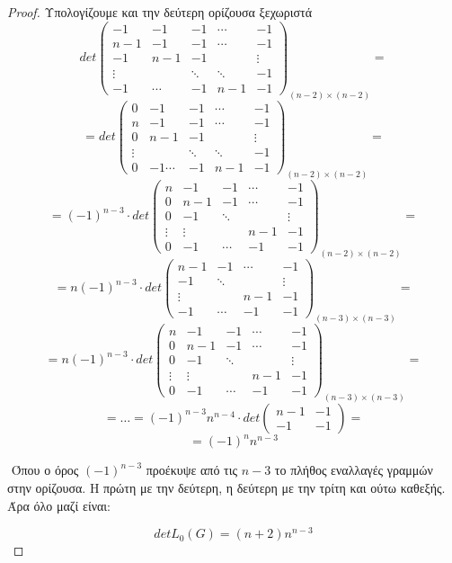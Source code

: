\documentclass[oneside,a4paper]{article}
\begin{document}
\begin{proof}
	$ $\newline Υπολογίζουμε και την δεύτερη ορίζουσα ξεχωριστά
	$$det \begin{pmatrix}
		-1 & -1 & -1 & \cdots & -1 \\
		n-1& -1 & -1 &  \cdots & -1 \\
		-1 &  n-1 & -1  &  & \vdots \\
		 \vdots &  & \ddots & \ddots & -1 \\
		-1 & \cdots  & -1 & n-1 & -1
	\end{pmatrix}_{(n-2)\times(n-2)} = $$
	$$ = det\begin{pmatrix}
		0 & -1 & -1 & \cdots & -1 \\
		n& -1 & -1 &  \cdots & -1 \\
		0 &  n-1 & -1  &  & \vdots \\
		 \vdots &  & \ddots & \ddots & -1 \\
		0 & -1\cdots  & -1 & n-1 & -1
	\end{pmatrix}_{(n-2)\times(n-2)} = $$
	$$ = (-1)^{n-3} \cdot det\begin{pmatrix}
		n & -1 & -1 & \cdots & -1 \\
		0& n-1 & -1 &  \cdots & -1 \\
		0 &  -1 & \ddots  &  & \vdots \\
		 \vdots &  \vdots &  & n-1 & -1 \\
		0 & -1  & \cdots & -1 & -1
	\end{pmatrix}_{(n-2)\times(n-2)} = $$
	$$ = n (-1)^{n-3} \cdot det\begin{pmatrix}
		 n-1 & -1 &  \cdots & -1 \\
		  -1 & \ddots  &  & \vdots \\
		  \vdots &  & n-1 & -1 \\
		-1  & \cdots & -1 & -1
	\end{pmatrix}_{(n-3)\times(n-3)} = $$
	$$ = n (-1)^{n-3} \cdot det\begin{pmatrix}
		n & -1 & -1 & \cdots & -1 \\
		0& n-1 & -1 &  \cdots & -1 \\
		0 &  -1 & \ddots  &  & \vdots \\
		 \vdots &  \vdots &  & n-1 & -1 \\
		0 & -1  & \cdots & -1 & -1
	\end{pmatrix}_{(n-3)\times(n-3)} = $$
	$$ = \ldots = (-1)^{n-3} n^{n-4} \cdot det\begin{pmatrix}
		n-1 & -1 \\
		-1 & -1
	\end{pmatrix} = $$
	$$ = (-1)^n n^{n-3}$$

	$ $\newline
	Όπου ο όρος $(-1)^{n-3}$ προέκυψε από τις $n-3$ το πλήθος εναλλαγές γραμμών στην ορίζουσα. Η πρώτη με την δεύτερη, η δεύτερη με την τρίτη και ούτω καθεξής. Άρα όλο μαζί είναι:

	$$detL_0(G) = (n+2)n^{n-3}$$
\end{proof}
\pagebreak
\end{document}
